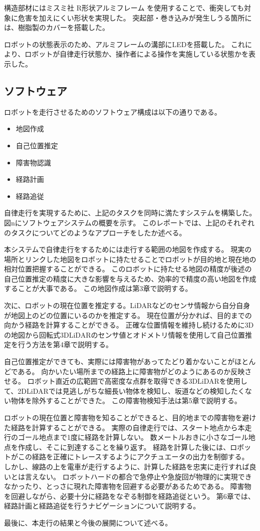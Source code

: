 構造部材にはミスミ社 R形状アルミフレーム を使用することで、衝突しても対象に危害を加えにくい形状を実現した。
突起部・巻き込みが発生しうる箇所には、樹脂製のカバーを搭載した。

ロボットの状態表示のため、アルミフレームの溝部にLEDを搭載した。
これにより、ロボットが自律走行状態か、操作者による操作を実施している状態かを表示した。

\subsection{ソフトウェア}
ロボットを走行させるためのソフトウェア構成は以下の通りである。
\begin{itemize}
    \item 地図作成
    \item 自己位置推定
    \item 障害物認識
    \item 経路計画
    \item 経路追従
\end{itemize}

自律走行を実現するために、上記のタスクを同時に満たすシステムを構築した。
図nにソフトウェアシステムの概要を示す。
このレポートでは、上記のそれぞれのタスクについてどのようなアプローチをしたか述べる。

本システムで自律走行をするためには走行する範囲の地図を作成する。
現実の場所とリンクした地図をロボットに持たせることでロボットが目的地と現在地の相対位置把握することができる。
このロボットに持たせる地図の精度が後述の自己位置推定の精度に大きな影響を与えるため、効率的で精度の高い地図を作成することが大事である。
この地図作成は第3章で説明する。

次に、ロボットの現在位置を推定する。LiDARなどのセンサ情報から自分自身が地図上のどの位置にいるのかを推定する。
現在位置が分かれば、目的までの向かう経路を計算することができる。
正確な位置情報を維持し続けるために3Dの地図から回転式3DLiDARのセンサ値とオドメトリ情報を使用して自己位置推定を行う方法を第4章で説明する。

自己位置推定ができても、実際には障害物があってたどり着かないことがほとんどである。
向かいたい場所までの経路上に障害物がどのようにあるのか反映させる。
ロボット直近の広範囲で高密度な点群を取得できる3DLiDARを使用して、2DLiDARでは見逃しがちな細長い物体を検知し、坂道などの検知したくない物体を除外することができた。
この障害物検知手法は第5章で説明する。

ロボットの現在位置と障害物を知ることができると、目的地までの障害物を避けた経路を計算することができる。
実際の自律走行では、スタート地点から本走行のゴール地点まで1度に経路を計算しない。
数メートルおきに小さなゴール地点を作成し、そこに到達することを繰り返す。
経路を計算した後には、ロボットがこの経路を正確にトレースするようにアクチュエータの出力を制御する。
しかし、線路の上を電車が走行するように、計算した経路を忠実に走行すれば良いとは言えない。
ロボットハードの都合で急停止や急旋回が物理的に実現できなかったり、とっさに現れた障害物を回避する必要があるためである。
障害物を回避しながら、必要十分に経路をなぞる制御を経路追従という。
第6章では、経路計画と経路追従を行うナビゲーションについて説明する。

最後に、本走行の結果と今後の展開について述べる。